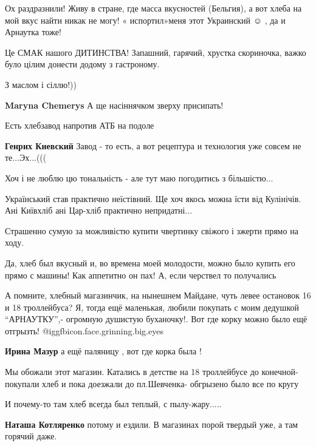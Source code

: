 \begin{itemize}
Ох раздразнили! Живу в стране, где масса вкусностей (Бельгия), а вот хлеба на
мой вкус найти никак не могу! « испортил»меня этот Украинский ☺ ️ , да и Арнаутка
тоже!


Це СМАК нашого ДИТИНСТВА! Запашний, гарячий, хрустка скориночка, важко було цілим донести додому з гастроному.

З маслом і сіллю!))

\begin{itemize} %
\textbf{Maryna Chemerys} А ще насіннячком зверху присипать!
\end{itemize} %

Есть хлебзавод напротив АТБ на подоле

\textbf{Генрих Киевский} Завод - то есть, а вот рецептура и технология уже совсем не те...Эх...(((


Хоч і не люблю цю тональність - але тут маю погодитись з більшістю...

Український став практично неїстівний. Ще хоч якось можна їсти від Кулінічів.
Ані Київхліб ані Цар-хліб практично непридатні...

Страшенно сумую за можливістю купити чвертинку свіжого і зжерти прямо на ходу.


Да, хлеб был вкусный и, во времена моей молодости, можно было купить его прямо
с машины! Как аппетитно он пах! А, если черствел то получались


А помните, хлебный магазинчик, на нынешнем Майдане, чуть левее остановок 16 и 18
троллейбуса? Я, тогда ещё маленькая, любили покупать с моим дедушкой
\enquote{АРНАУТКУ},- огромную душистую буханочку!. Вот где корку можно было ещё
отгрызть! @igg{fbicon.face.grinning.big.eyes} 

\begin{itemize} %
\textbf{Ирина Мазур} а ещё паляницу , вот где корка была !

Мы обожали этот магазин. Катались в детстве на 18 троллейбусе до конечной-покупали хлеб и пока доезжали до пл.Шевченка- обгрызено было все по кругу

И почему-то там хлеб всегда был теплый, с пылу-жару.....

\textbf{Наташа Котляренко} потому и ездили. В магазинах порой твердый уже, а там горячий даже.
\end{itemize} %


\end{itemize}
